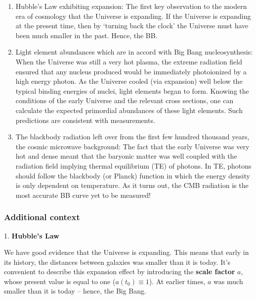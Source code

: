 \documentclass[a4paper,11pt]{article}
\begin{document}
\begin{enumerate}
    \item Hubble's Law exhibiting expansion: The first key observation to the modern era of cosmology that the Universe is expanding. If the Universe is expanding at the present time, then by `turning back the clock' the Universe must have been much smaller in the past. Hence, the BB.
    \item Light element abundances which are in accord with Big Bang nucleosynthesis: When the Universe was still a very hot plasma, the extreme radiation field ensured that any nucleus produced would be immediately photoionized by a high energy photon. As the Universe cooled (via expansion) well below the typical binding energies of nuclei, light elements began to form. Knowing the conditions of the early Universe and the relevant cross sections, one can calculate the expected primordial abundances of these light elements. Such predictions are consistent with measurements.
    \item The blackbody radiation left over from the first few hundred thousand years, the cosmic microwave background: The fact that the early Universe was very hot and dense meant that the baryonic matter was well coupled with the radiation field implying thermal equilibrium (TE) of photons. In TE, photons should follow the blackbody (or Planck) function in which the energy density is only dependent on temperature. As it turns out, the CMB radiation is the most accurate BB curve yet to be measured!
\end{enumerate}

\subsubsection{Additional context}

1. \textbf{Hubble's Law}

{\noindent}We have good evidence that the Universe is expanding. This means that early in its history, the distances between galaxies was smaller than it is today. It's convenient to describe this expansion effect by introducing the \textbf{scale factor} $a$, whose present value is equal to one ($a(t_0)\equiv1$). At earlier times, $a$ was much smaller than it is today -- hence, the Big Bang. 
\end{document}
